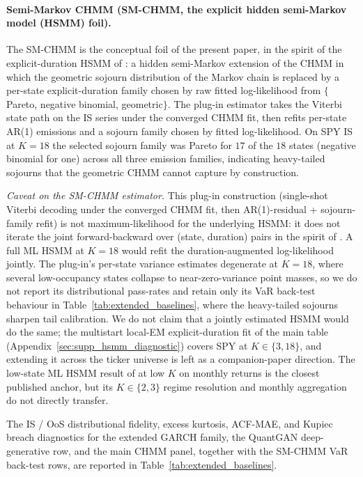 \paragraph{Semi-Markov CHMM (SM-CHMM, the explicit hidden semi-Markov model (HSMM) foil).}
The SM-CHMM is the conceptual foil of the present paper, in the spirit of the explicit-duration HSMM of \citet{yu2010hidden}: a hidden semi-Markov extension of the CHMM in which the geometric sojourn distribution of the Markov chain is replaced by a per-state explicit-duration family chosen by raw fitted log-likelihood from $\{$Pareto, negative binomial, geometric$\}$. The plug-in estimator takes the Viterbi state path on the IS series under the converged CHMM fit, then refits per-state AR(1) emissions and a sojourn family chosen by fitted log-likelihood. On SPY IS at $K = 18$ the selected sojourn family was Pareto for $17$ of the $18$ states (negative binomial for one) across all three emission families, indicating heavy-tailed sojourns that the geometric CHMM cannot capture by construction.

\medskip
\noindent\emph{Caveat on the SM-CHMM estimator.} This plug-in construction (single-shot Viterbi decoding under the converged CHMM fit, then AR(1)-residual + sojourn-family refit) is not maximum-likelihood for the underlying HSMM: it does not iterate the joint forward-backward over (state, duration) pairs in the spirit of \citet{yu2010hidden}. A full ML HSMM at $K = 18$ would refit the duration-augmented log-likelihood jointly. The plug-in's per-state variance estimates degenerate at $K = 18$, where several low-occupancy states collapse to near-zero-variance point masses, so we do not report its distributional pass-rates and retain only its VaR back-test behaviour in Table~\ref{tab:extended_baselines}, where the heavy-tailed sojourns sharpen tail calibration. We do not claim that a jointly estimated HSMM would do the same; the multistart local-EM explicit-duration fit of the main table (Appendix~\ref{sec:supp_hsmm_diagnostic}) covers SPY at $K \in \{3, 18\}$, and extending it across the ticker universe is left as a companion-paper direction. The low-state ML HSMM result of \citet{bulla2006stylized} at low $K$ on monthly returns is the closest published anchor, but its $K \in \{2, 3\}$ regime resolution and monthly aggregation do not directly transfer.

The IS / OoS distributional fidelity, excess kurtosis, ACF-MAE, and Kupiec breach diagnostics for the extended GARCH family, the QuantGAN deep-generative row, and the main CHMM panel, together with the SM-CHMM VaR back-test rows, are reported in Table~\ref{tab:extended_baselines}.

